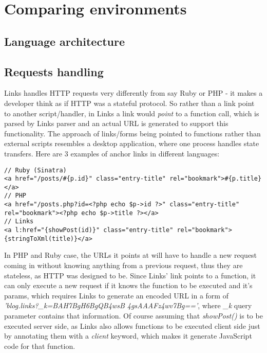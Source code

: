 
\chapter{Comparing environments}

\section{Language architecture}

\section{Requests handling}

Links handles HTTP requests very differently from say Ruby or PHP - it makes a developer think as if HTTP was a stateful protocol. So rather than a link point to another script/handler, in Links a link would \textit{point} to a function call, which is parsed by Links parser and an actual URL is generated to support this functionality. The approach of links/forms being pointed to functions rather than external scripts resembles a desktop application, where one process handles state transfers. Here are 3 examples of anchor links in different languages:

\begin{codelisting}
\begin{verbatim}
// Ruby (Sinatra)
<a href="/posts/#{p.id}" class="entry-title" rel="bookmark">#{p.title}</a>
// PHP
<a href="/posts.php?id=<?php echo $p->id ?>" class="entry-title" rel="bookmark"><?php echo $p->title ?></a>
// Links
<a l:href="{showPost(id)}" class="entry-title" rel="bookmark">{stringToXml(title)}</a>
\end{verbatim}
\end{codelisting}

In PHP and Ruby case, the URLs it points at will have to handle a new request coming in without knowing anything from a previous request, thus they are stateless, as HTTP was designed to be. Since Links' link points to a function, it can only execute a new request if it knows the function to be executed and it's params, which requires Links to generate an encoded URL in a form of \textit{'blog.links?\_k=BAH7BgH6BgQB4wsB 4gsAAAFz4wv7Bg=='}, where \textit{\_k} query parameter contains that information. Of course assuming that \textit{showPost()} is to be executed server side, as Links also allows functions to be executed client side just by annotating them with a \textit{client} keyword, which makes it generate JavaScript code for that function.

